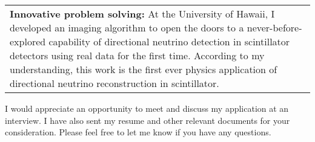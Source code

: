 \documentclass[11pt,letterpaper,sans]{moderncv}        %
\begin{document}
\begin{tabularx}{\linewidth}{@{{}\textbullet\enskip}X@{\quad}@{}}
	\textbf{Innovative problem solving:} At the University of Hawaii, I
	developed an imaging algorithm to open the doors to a never-before-explored
	capability of directional neutrino detection in scintillator detectors
	using real data for the first time. According to my understanding, this
	work is the first ever physics application of directional neutrino
	reconstruction in scintillator.%
\end{tabularx}


I would appreciate an opportunity to meet and discuss my application at an
interview. I have also sent my resume and other relevant documents for your
consideration. Please feel free to let me know if you have any questions.

\makeletterclosing
\end{document}

